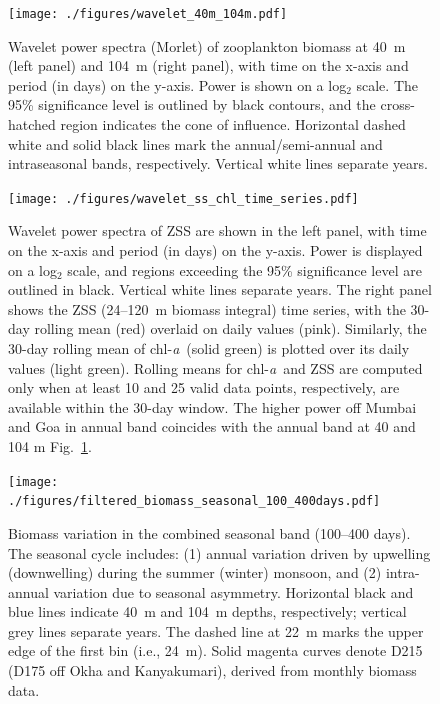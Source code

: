 \documentclass[authoryear,review,11pt]{elsarticle}
\newcommand{\chla}{chl-{\emph{a}}}
\begin{document}
\begin{figure}[htbp]
	\centering
	\texttt{[image: ./figures/wavelet\_40m\_104m.pdf]} 
	\captionsetup{justification=justified,font=footnotesize,skip=0.05\baselineskip,width=\textwidth}
	\caption{Wavelet power spectra (Morlet) of zooplankton biomass at 40~m (left panel) and 104~m (right panel), with time on the x-axis and period (in days) on the y-axis. Power is shown on a log$_2$ scale. The 95\% significance level is outlined by black contours, and the cross-hatched region indicates the cone of influence. Horizontal dashed white and solid black lines mark the annual/semi-annual and intraseasonal bands, respectively. Vertical white lines separate years.}
	\label{fig:wavelet_40m_104m}
\end{figure}


\begin{figure}[htbp]
	\centering
	\texttt{[image: ./figures/wavelet\_ss\_chl\_time\_series.pdf]} 
	\captionsetup{justification=justified,font=footnotesize,skip=0.05\baselineskip,width=\textwidth}
	\caption{Wavelet power spectra of ZSS are shown in the left panel, with time on the x-axis and period (in days) on the y-axis. Power is displayed on a log$_2$ scale, and regions exceeding the 95\% significance level are outlined in black. Vertical white lines separate years. The right panel shows the ZSS (24--120~m biomass integral) time series, with the 30-day rolling mean (red) overlaid on daily values (pink). Similarly, the 30-day rolling mean of \chla\ (solid green) is plotted over its daily values (light green). Rolling means for \chla\ and ZSS are computed only when at least 10 and 25 valid data points, respectively, are available within the 30-day window. The higher power off Mumbai and Goa in annual band coincides with the annual band at 40 and 104 m Fig.~\ref{fig:wavelet_40m_104m}.}
	\label{fig:wavelet_ss_chl_time_series}
\end{figure}

\begin{figure}[htbp]
	\centering
	\texttt{[image: ./figures/filtered\_biomass\_seasonal\_100\_400days.pdf]} 
	\captionsetup{justification=justified,font=footnotesize,skip=0.05\baselineskip,width=\textwidth}
	\caption{Biomass variation in the combined seasonal band (100--400 days). The seasonal cycle includes: (1) annual variation driven by upwelling (downwelling) during the summer (winter) monsoon, and (2) intra-annual variation due to seasonal asymmetry. Horizontal black and blue lines indicate 40~m and 104~m depths, respectively; vertical grey lines separate years. The dashed line at 22~m marks the upper edge of the first bin (i.e., 24~m). Solid magenta curves denote D215 (D175 off Okha and Kanyakumari), derived from monthly biomass data.}
	\label{fig:filtered_biomass_seasonal_100_400days}
\end{figure}
\end{document}
